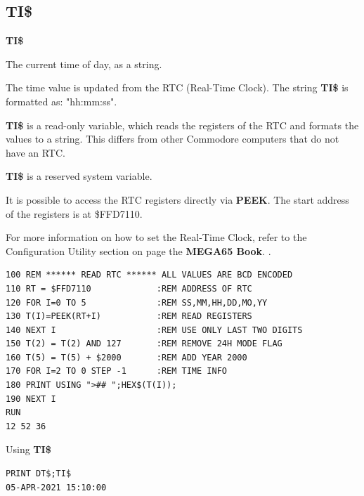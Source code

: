 \subsection{TI\$}
\begin{description}[leftmargin=2cm,style=nextline]
\item [Format:] {\bf TI\$}
\item [Usage:]  The current time of day, as a string.

                The time value is updated from the RTC
                (Real-Time Clock). The string {\bf TI\$} is formatted as:
                "hh:mm:ss".

                {\bf TI\$} is a read-only variable, which reads the registers
                of the RTC and formats the values to a string. This differs
                from other Commodore computers that do not have an RTC.

\item [Remarks:]
                {\bf TI\$} is a reserved system variable.

                It is possible to access the RTC registers directly
                via {\bf PEEK}. The start address of the registers is at
                \$FFD7110.

                For more information on how to set the Real-Time Clock,
                refer to the Configuration Utility section on page
\ifdefined\printmanual
the {\bf MEGA65 Book}.
\else
 .
\fi

\begin{tcolorbox}[colback=black,coltext=white]
\verbatimfont{\codefont}
\begin{verbatim}
100 REM ****** READ RTC ****** ALL VALUES ARE BCD ENCODED
110 RT = $FFD7110             :REM ADDRESS OF RTC
120 FOR I=0 TO 5              :REM SS,MM,HH,DD,MO,YY
130 T(I)=PEEK(RT+I)           :REM READ REGISTERS
140 NEXT I                    :REM USE ONLY LAST TWO DIGITS
150 T(2) = T(2) AND 127       :REM REMOVE 24H MODE FLAG
160 T(5) = T(5) + $2000       :REM ADD YEAR 2000
170 FOR I=2 TO 0 STEP -1      :REM TIME INFO
180 PRINT USING ">## ";HEX$(T(I));
190 NEXT I
RUN
12 52 36
\end{verbatim}
\end{tcolorbox}

\item [Example:] Using {\bf TI\$}
\begin{tcolorbox}[colback=black,coltext=white]
\verbatimfont{\codefont}
\begin{verbatim}
PRINT DT$;TI$
05-APR-2021 15:10:00
\end{verbatim}
\end{tcolorbox}
\end{description}


